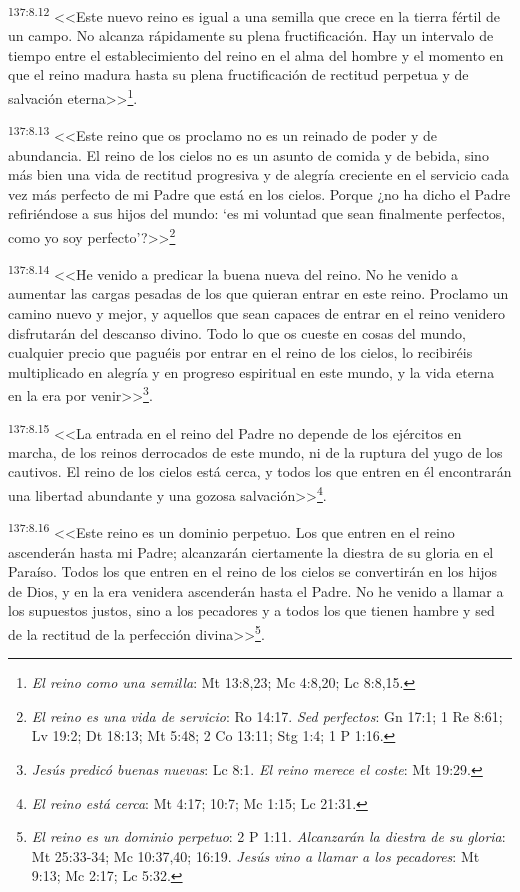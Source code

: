 \par 
\textsuperscript{137:8.12} <<Este nuevo reino es igual a una semilla que crece en la tierra fértil de un campo. No alcanza rápidamente su plena fructificación. Hay un intervalo de tiempo entre el establecimiento del reino en el alma del hombre y el momento en que el reino madura hasta su plena fructificación de rectitud perpetua y de salvación eterna>>\footnote{\textit{El reino como una semilla}: Mt 13:8,23; Mc 4:8,20; Lc 8:8,15.}.

\par 
\textsuperscript{137:8.13} <<Este reino que os proclamo no es un reinado de poder y de abundancia. El reino de los cielos no es un asunto de comida y de bebida, sino más bien una vida de rectitud progresiva y de alegría creciente en el servicio cada vez más perfecto de mi Padre que está en los cielos. Porque ¿no ha dicho el Padre refiriéndose a sus hijos del mundo: `es mi voluntad que sean finalmente perfectos, como yo soy perfecto'?>>\footnote{\textit{El reino es una vida de servicio}: Ro 14:17. \textit{Sed perfectos}: Gn 17:1; 1 Re 8:61; Lv 19:2; Dt 18:13; Mt 5:48; 2 Co 13:11; Stg 1:4; 1 P 1:16.}

\par 
\textsuperscript{137:8.14} <<He venido a predicar la buena nueva del reino. No he venido a aumentar las cargas pesadas de los que quieran entrar en este reino. Proclamo un camino nuevo y mejor, y aquellos que sean capaces de entrar en el reino venidero disfrutarán del descanso divino. Todo lo que os cueste en cosas del mundo, cualquier precio que paguéis por entrar en el reino de los cielos, lo recibiréis multiplicado en alegría y en progreso espiritual en este mundo, y la vida eterna en la era por venir>>\footnote{\textit{Jesús predicó buenas nuevas}: Lc 8:1. \textit{El reino merece el coste}: Mt 19:29.}.

\par 
\textsuperscript{137:8.15} <<La entrada en el reino del Padre no depende de los ejércitos en marcha, de los reinos derrocados de este mundo, ni de la ruptura del yugo de los cautivos. El reino de los cielos está cerca, y todos los que entren en él encontrarán una libertad abundante y una gozosa salvación>>\footnote{\textit{El reino está cerca}: Mt 4:17; 10:7; Mc 1:15; Lc 21:31.}.

\par 
\textsuperscript{137:8.16} <<Este reino es un dominio perpetuo. Los que entren en el reino ascenderán hasta mi Padre; alcanzarán ciertamente la diestra de su gloria en el Paraíso. Todos los que entren en el reino de los cielos se convertirán en los hijos de Dios, y en la era venidera ascenderán hasta el Padre. No he venido a llamar a los supuestos justos, sino a los pecadores y a todos los que tienen hambre y sed de la rectitud de la perfección divina>>\footnote{\textit{El reino es un dominio perpetuo}: 2 P 1:11. \textit{Alcanzarán la diestra de su gloria}: Mt 25:33-34; Mc 10:37,40; 16:19. \textit{Jesús vino a llamar a los pecadores}: Mt 9:13; Mc 2:17; Lc 5:32.}.

